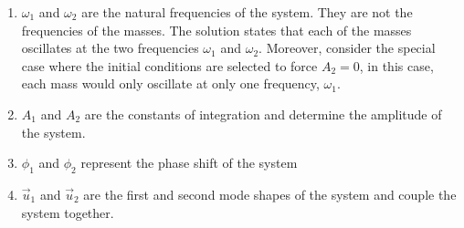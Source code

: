 \documentclass[12pt,letter]{article}
\begin{document}
	\begin{enumerate}
	\item $\omega_1$ and $\omega_2$ are the natural frequencies of the system. They are not the frequencies of the masses. The solution states that each of the masses oscillates at the two frequencies $\omega_1$ and $\omega_2$. Moreover, consider the special case where the initial conditions are selected to force $A_2 = 0$, in this case, each mass would only oscillate at only one frequency, $\omega_1$.
	\item $A_1$ and $A_2$ are the constants of integration and determine the amplitude of the system.
	\item $\phi_1$ and $\phi_2$ represent the phase shift of the system
	\item $\vec{u}_1$ and $\vec{u}_2$ are the first and second mode shapes of the system and couple the system together.
	\end{enumerate}
	
\end{document}
